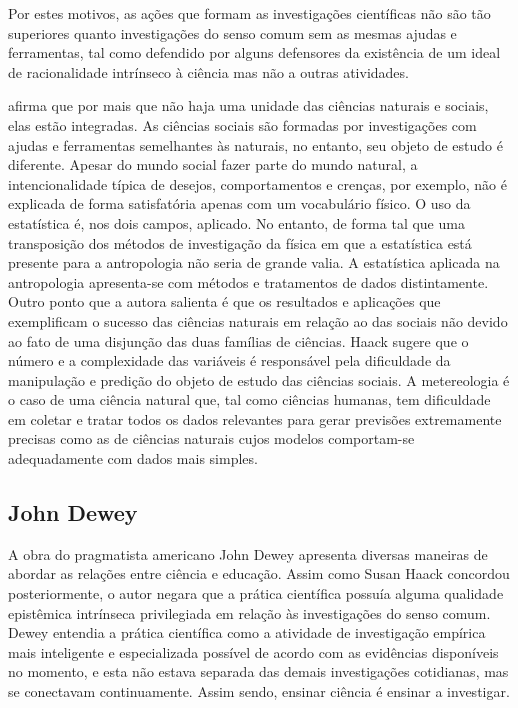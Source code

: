 \documentclass[12pt]{report}
\begin{document}
		Por estes motivos, as ações que formam as investigações científicas não são tão superiores quanto investigações do senso comum sem as mesmas ajudas e ferramentas, tal como defendido por alguns defensores da existência de um ideal de racionalidade intrínseco à ciência mas não a outras atividades.

		\textcite{haack-defending-science} afirma que por mais que não haja uma unidade das ciências naturais e sociais, elas estão integradas. As ciências sociais são formadas por investigações com ajudas e ferramentas semelhantes às naturais, no entanto, seu objeto de estudo é diferente. Apesar do mundo social fazer parte do mundo natural, a intencionalidade típica de desejos, comportamentos e crenças, por exemplo, não é explicada de forma satisfatória apenas com um vocabulário físico. O uso da estatística é, nos dois campos, aplicado. No entanto, de forma tal que uma transposição dos métodos de investigação da física em que a estatística está presente para a antropologia não seria de grande valia. A estatística aplicada na antropologia apresenta-se com métodos e tratamentos de dados distintamente. Outro ponto que a autora salienta é que os resultados e aplicações que exemplificam o sucesso das ciências naturais em relação ao das sociais não devido ao fato de uma disjunção das duas famílias de ciências. Haack sugere que o número e a complexidade das variáveis é responsável pela dificuldade da manipulação e predição do objeto de estudo das ciências sociais. A metereologia é o caso de uma ciência natural que, tal como ciências humanas, tem dificuldade em coletar e tratar todos os dados relevantes para gerar previsões extremamente precisas como as de ciências naturais cujos modelos comportam-se adequadamente com dados mais simples.
	
	\subsection{John Dewey}
	
		A obra do pragmatista americano John Dewey apresenta diversas maneiras de abordar as relações entre ciência e educação. Assim como Susan Haack concordou posteriormente, o autor negara que a prática científica possuía alguma qualidade epistêmica intrínseca privilegiada em relação às investigações do senso comum. Dewey entendia a prática científica como a atividade de investigação empírica mais inteligente e especializada possível de acordo com as evidências disponíveis no momento, e esta não estava separada das demais investigações cotidianas, mas se conectavam continuamente. Assim sendo, ensinar ciência é ensinar a investigar.
		
\end{document}
